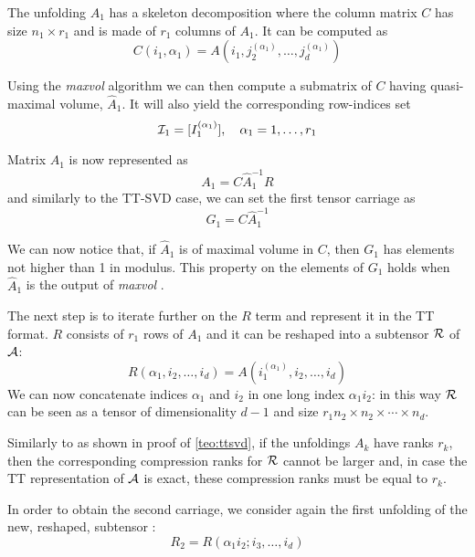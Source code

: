 The unfolding $A_1$ has a skeleton decomposition where the column matrix $C$ has size $n_1 \times r_1$ and is made of $r_1$ columns of $A_1$.
It can be computed as
\begin{equation*}
  C(i_1,\alpha_1) = A(i_1,j_2^{(\alpha_1)},\ldots,j_d^{(\alpha_1)})
\end{equation*}

Using the \emph{maxvol} algorithm we can then compute a submatrix of $C$ having quasi-maximal volume, $\hat{A}_1$. It will also yield the corresponding row-indices set
\begin{equation*}
  \mathcal{I}_1 = [I_1^{(\alpha_1)}], \quad \alpha_1 = 1,\ldots,r_1
\end{equation*}

Matrix $A_1$ is now represented as
\begin{equation*}
  A_1 = C\hat{A}_1^{-1}R
\end{equation*}
and similarly to the TT-SVD case, we can set the first tensor carriage as
\begin{equation*}
  G_1 = C\hat{A}_1^{-1}
\end{equation*}

We can now notice that, if $\hat{A}_1$ is of maximal volume in $C$, then $G_1$ has elements not higher than 1 in modulus. This property on the elements of $G_1$ holds when $\hat{A}_1$ is the output of \emph{maxvol} \cite{tyrtyshnikov2000incomplete,goreinov2010find}.

The next step is to iterate further on the $R$ term and represent it in the TT format. $R$ consists of $r_1$ rows of $A_1$ and it can be reshaped into a subtensor $\mathcal{R}$ of $\mathcal{A}$:
\begin{equation*}
  R(\alpha_1,i_2,\ldots,i_d) = A(i_1^{(\alpha_1)},i_2,\ldots,i_d)
\end{equation*}
We can now concatenate indices $\alpha_1$ and $i_2$ in one long index $\alpha_1i_2$: in this way $\mathcal{R}$ can be seen as a tensor of dimensionality $d-1$ and size $r_1n_2 \times n_2 \times \cdots \times n_d$.

Similarly to as shown in proof of \ref{teo:ttsvd}, if the unfoldings $A_k$ have ranks $r_k$, then the corresponding compression ranks for $\mathcal{R}$ cannot be larger and, in case the TT representation of $\mathcal{A}$ is exact, these compression ranks must be equal to $r_k$.

In order to obtain the second carriage, we consider again the first unfolding of the new, reshaped, subtensor :
\begin{equation*}
  R_2 = R(\alpha_1i_2;i_3,\ldots,i_d)
\end{equation*}

